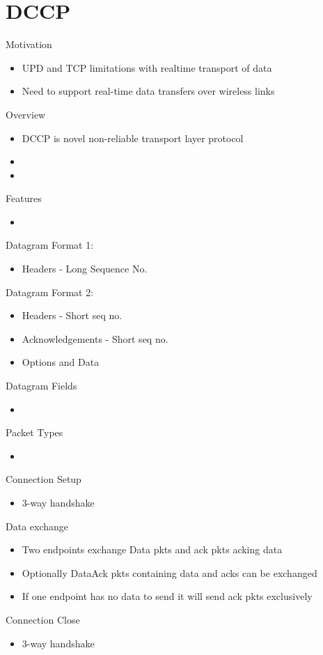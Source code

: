 \documentclass[a4paper]{article}
\begin{document}
\section{DCCP}
Motivation
\begin{itemize}
	\item UPD and TCP limitations with realtime transport of data
	\item Need to support real-time data transfers over wireless links
\end{itemize}
Overview
\begin{itemize}
	\item DCCP is novel non-reliable transport layer protocol
	\item
	\item
\end{itemize}
Features
\begin{itemize}
	\item
\end{itemize}
Datagram Format 1:
\begin{itemize}
	\item Headers - Long Sequence No.
\end{itemize}
Datagram Format 2:
\begin{itemize}
	\item Headers - Short seq no.
	\item Acknowledgements - Short seq no.
	\item Options and Data
\end{itemize}
Datagram Fields
\begin{itemize}
	\item
\end{itemize}
Packet Types
\begin{itemize}
	\item
\end{itemize}
Connection Setup
\begin{itemize}
	\item 3-way handshake
\end{itemize}
Data exchange
\begin{itemize}
	\item Two endpoints exchange Data pkts and ack pkts acking data
	\item Optionally DataAck pkts containing data and acks can be exchanged
	\item If one endpoint has no data to send it will send ack pkts
		exclusively
\end{itemize}
Connection Close
\begin{itemize}
	\item 3-way handshake
\end{itemize}
\end{document}
